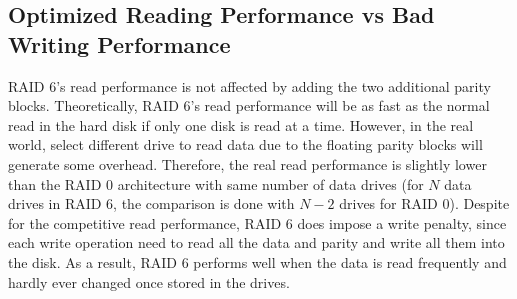 \subsection{Optimized Reading Performance vs Bad Writing Performance}
RAID 6's read performance is not affected by adding the two additional parity blocks. Theoretically, RAID 6's read performance will be as fast as the normal read in the hard disk if only one disk is read at a time. However, in the real world, select different drive to read data due to the floating parity blocks will generate some overhead. Therefore, the real read performance is slightly lower than the RAID 0 architecture with same number of data drives (for $N$ data drives in RAID 6, the comparison is done with $N-2$ drives for RAID 0).
Despite for the competitive read performance, RAID 6 does impose a write penalty, since each write operation need to read all the data and parity and write all them into the disk. As a result, RAID 6 performs well when the data is read frequently and hardly ever changed once stored in the drives.
